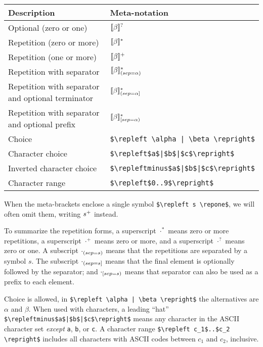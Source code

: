 \begin{center}
\begin{tabular}{ll}
Description & Meta-notation\\
\hline
Optional (zero or one) & $[\![ \beta ]\!]^{?}$\\
Repetition (zero or more) & $[\![ \beta ]\!]^{*}$\\
Repetition (one or more) & $[\![ \beta ]\!]^{+}$\\
Repetition with separator & $[\![ \beta ]\!]^{*}_{({\footnotesize sep=}\alpha)}$\\
Repetition with separator and optional terminator & $[\![ \beta ]\!]^{*}_{({\footnotesize sep=}\alpha]}$\\
Repetition with separator and optional prefix & $[\![ \beta ]\!]^{*}_{[{\footnotesize sep=}\alpha)}$\\
Choice & \hbox{\lstinline/$\repleft \alpha | \beta \repright$/}\\
Character choice & \hbox{\lstinline/$\repleft$a$|$b$|$c$\repright$/}\\
Inverted character choice & \hbox{\lstinline/$\repleftminus$a$|$b$|$c$\repright$/}\\
Character range & \hbox{\lstinline/$\repleft$0..9$\repright$/}
\end{tabular}
\end{center}
%
When the meta-brackets enclose a single symbol \hbox{\lstinline/$\repleft s \repone$/}, we will often omit
them, writing $s^{+}$ instead.

To summarize the repetition forms, a superscript $\cdot^*$ means zero or more repetitions, a
superscript $\cdot^+$ means zero or more, and a superscript $\cdot^?$ means zero or one.  A
subscript $\cdot_{({\footnotesize sep=} s)}$ means that the repetitions are separated by a symbol $s$.  The 
subscript $\cdot_{({\footnotesize sep=} s]}$ means that the final element is optionally followed by the separator;
and $\cdot_{[{\footnotesize sep=} s)}$ means that separator can also be used as a prefix to each element.

Choice is allowed, in \hbox{\lstinline/$\repleft \alpha | \beta \repright$/} the alternatives are $\alpha$
and $\beta$.  When used with characters, a leading ``hat''
\hbox{\lstinline/$\repleftminus$a$|$b$|$c$\repright$/} means any character in the ASCII character set
\emph{except} \hbox{\lstinline/a/}, \hbox{\lstinline/b/}, or \hbox{\lstinline/c/}.  A character range
\hbox{\lstinline/$\repleft c_1$..$c_2 \repright$/} includes all characters with ASCII codes between $c_1$
and $c_2$, inclusive.

